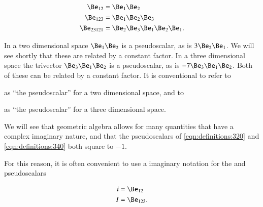\begin{equation}\label{eqn:multivector_nomenclature:360}
\begin{aligned}
\Be_{12} &= \Be_1 \Be_2 \\
\Be_{123} &= \Be_1 \Be_2 \Be_3 \\
\Be_{23121} &= \Be_2 \Be_3 \Be_1 \Be_2 \Be_1.
\end{aligned}
\end{equation}


In a two dimensional space \( \Be_1 \Be_2 \) is a pseudoscalar, as is \( 3 \Be_2 \Be_1 \).
We will see shortly that these are related by a constant factor.
In a three dimensional space the trivector
\( \Be_3 \Be_1 \Be_2 \) is a pseudoscalar, as is \( - 7 \Be_3 \Be_1 \Be_2 \).
Both of these can be related by a constant factor.
It is conventional to refer to


as ``the pseudoscalar'' for a two dimensional space, and to


as ``the pseudoscalar'' for a three dimensional space.

We will see that geometric algebra allows for many quantities that have a complex imaginary nature, and that the pseudoscalars of \cref{eqn:definitions:320} and \cref{eqn:definitions:340} both square to \(-1\).

For this reason, it is often convenient to use a imaginary notation for the  and  pseudoscalars

\begin{dmath}\label{eqn:multivector_nomenclature:42}
\begin{aligned}
i &= \Be_{12} \\
I &= \Be_{123}.
\end{aligned}
\end{dmath}


